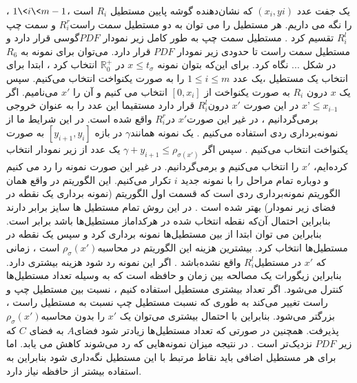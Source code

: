 یک جفت عدد $(x_{i},y{i})$ که نشان‌دهنده گوشه پایین مستطیل $R_{i}$ است ،$1\< i \< m - 1$ ، را نگه می داریم. 
هر مستطیل را می توان به دو مستطیل  سمت راست$ R^{r}_{i}$ و  سمت چپ$ R^{l}_{i}$ تقسیم کرد . مستطیل سمت چپ به طور کامل زیر نمودار $PDF$گوسی قرار دارد و مستطیل سمت راست تا حدودی زیر نمودار $PDF$  قرار دارد. می‌توان برای نمونه به $R_{6}$  در شکل ... نگاه کرد.
برای این‌که بتوان نمونه $x \leq t_{\sigma}$  در $\mathbb{R}^{+}_{0}$  انتخاب کرد ، ابتدا برای انتخاب یک مستطیل ،یک عدد $1 \leq i \leq m$ را به صورت یکنواخت انتخاب می‌کنیم.  سپس یک $ x$  درون $R_{i}$ به صورت یکنواخت  از  $[0, x_{i}]$ انتخاب می کنیم  و آن را $x'$  می‌نامیم. اگر$ x’\leq   x_{i – 1}$   در این صورت  $x'$   درون$ R^{l}_{i}$ قرار دارد مستقیما این عدد را به عنوان خروجی برمی‌گردانیم ، در غیر این صورت$x'$  در$ R^{r}_{i}$ واقع شده است. در این شرایط ما از نمونه‌برداری ردی استفاده می‌کنیم . یک نمونه همانند$\gamma$  در بازه $ [y_{i+1}, y_{i}]$ به صورت یکنواخت انتخاب می‌کنیم . سپس اگر $\gamma + y_{i+1}\leq \rho _{\sigma (x')}$ یک عدد از زیر نمودار انتخاب کرده‌ایم،   $x'$ را انتخاب می‌کنیم و برمی‌گردانیم. در غیر این صورت نمونه را رد می کنیم و دوباره تمام مراحل را  با نمونه‌ جدید $i$  تکرار می‌کنیم.
این الگوریتم در واقع همان الگوریتم نمونه‌برداری ردی است که قسمت اول الگوریتم (نمونه برداری یک نقطه در فضای زیر نمودار) بهتر شده است . در این روش تمام مستطیل ها سایز برابر دارند بنابراین احتمال آن‌که نقطه انتخاب شده در هرکداماز  مستطیل‌ها باشد برابر است. بنابراین می توان ابتدا از بین مستطیل‌ها نمونه برداری کرد و سپس یک نقطه در مستطیل‌ها انتخاب کرد.
بیشترین هزینه این الگوریتم‌ در محاسبه$\rho_{\sigma}(x')$  است ، زمانی که  $x'$ در مستطیل$ R^{l}_{i}$ واقع نشده‌باشد .  اگر این نمونه رد شود هزینه بیشتری دارد. بنابراین زیگورات یک مصالحه بین زمان و حافظه است که به وسیله تعداد مستطیل‌ها کنترل می‌شود. اگر تعداد بیشتری مستطیل استفاده کنیم ، نسبت بین مستطیل  چپ و راست تغییر می‌کند به طوری که نسبت مستطیل چپ نسبت به مستطیل راست ، بزرگتر می‌شود. بنابراین با احتمال بیشتری می‌توان  یک $x'$ را بدون محاسبه$\rho_{\sigma}(x')$    پذیرفت.  همچنین در صورتی که تعداد مستطیل‌ها زیادتر شود فضای$ A$  به فضای $C$   که زیر $PDF$ نزدیک‌تر است . در نتیجه میزان نمونه‌‌هایی که رد می‌شوند کاهش می یابد. اما برای هر مستطیل اضافی باید نقاط مرتبط با این مستطیل نگه‌داری شود بنابراین به استفاده بیشتر از حافظه نیاز دارد.
